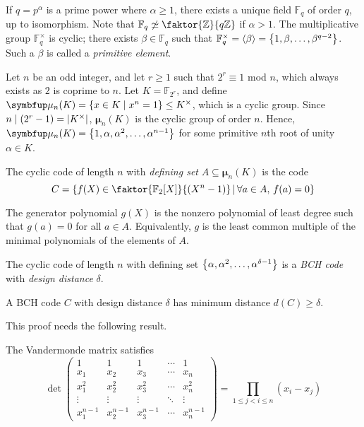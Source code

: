 If \( q = p^\alpha \) is a prime power where \( \alpha \geq 1 \), there exists a unique field \( \mathbb F_q \) of order \( q \), up to isomorphism.
Note that \( \mathbb F_q \not\simeq \faktor{\mathbb Z}{q\mathbb Z} \) if \( \alpha > 1 \).
The multiplicative group \( \mathbb F_q^\times \) is cyclic; there exists \( \beta \in \mathbb F_q \) such that \( \mathbb F_q^\times = \left\langle{} \beta \right\rangle = \qty{1, \beta, \dots, \beta^{q-2}} \).
Such a \( \beta \) is called a \emph{primitive element}.

Let \( n \) be an odd integer, and let \( r \geq 1 \) such that \( 2^r \equiv 1 \) mod \( n \), which always exists as \( 2 \) is coprime to \( n \).
Let \( K = \mathbb F_{2^r} \), and define \( \bm \mu_n(K) = \qty{x \in K \mid x^n = 1} \leq K^\times \), which is a cyclic group.
Since \( n \mid (2^r - 1) = \abs{K^\times} \), \( \bm \mu_n(K) \) is the cyclic group of order \( n \).
Hence, \( \bm \mu_n(K) = \qty{1, \alpha, \alpha^2, \dots, \alpha^{n-1}} \) for some primitive \( n \)th root of unity \( \alpha \in K \).
\begin{definition}
    The cyclic code of length \( n \) with \emph{defining set} \( A \subseteq \bm\mu_n(K) \) is the code
    \[ C = \qty{f(X) \in \faktor{\mathbb F_2[X]}{(X^n - 1)} \midd \forall a \in A,\, f(a) = 0} \]
\end{definition}
The generator polynomial \( g(X) \) is the nonzero polynomial of least degree such that \( g(a) = 0 \) for all \( a \in A \).
Equivalently, \( g \) is the least common multiple of the minimal polynomials of the elements of \( A \).
\begin{definition}
    The cyclic code of length \( n \) with defining set \( \qty{\alpha, \alpha^2, \dots, \alpha^{\delta - 1}} \) is a \emph{BCH code} with \emph{design distance} \( \delta \).
\end{definition}
\begin{theorem}
    A BCH code \( C \) with design distance \( \delta \) has minimum distance \( d(C) \geq \delta \).
\end{theorem}
This proof needs the following result.
\begin{lemma}
    The Vandermonde matrix satisfies
    \[ \det \begin{pmatrix}
        1 & 1 & 1 & \cdots & 1 \\
        x_1 & x_2 & x_3 & \cdots & x_n \\
        x_1^2 & x_2^2 & x_3^2 & \cdots & x_n^2 \\
        \vdots & \vdots & \vdots & \ddots & \vdots \\
        x_1^{n-1} & x_2^{n-1} & x_3^{n-1} & \cdots & x_n^{n-1}
    \end{pmatrix} = \prod_{1 \leq j < i \leq n} (x_i - x_j) \]
\end{lemma}

